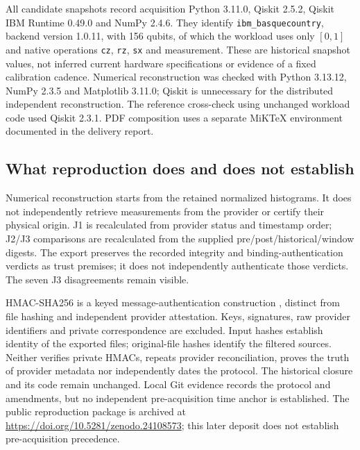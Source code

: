 \documentclass[11pt,a4paper]{article}
\begin{document}
All candidate snapshots record acquisition Python 3.11.0, Qiskit 2.5.2, Qiskit IBM Runtime 0.49.0 and NumPy 2.4.6. They identify \texttt{ibm\_basquecountry}, backend version 1.0.11, with 156 qubits, of which the workload uses only $[0,1]$ and native operations \texttt{cz}, \texttt{rz}, \texttt{sx} and measurement. These are historical snapshot values, not inferred current hardware specifications or evidence of a fixed calibration cadence. Numerical reconstruction was checked with Python 3.13.12, NumPy 2.3.5 and Matplotlib 3.11.0; Qiskit is unnecessary for the distributed independent reconstruction. The reference cross-check using unchanged workload code used Qiskit 2.3.1. PDF composition uses a separate MiKTeX environment documented in the delivery report.

\subsection{What reproduction does and does not establish}
Numerical reconstruction starts from the retained normalized histograms. It does not independently retrieve measurements from the provider or certify their physical origin. J1 is recalculated from provider status and timestamp order; J2/J3 comparisons are recalculated from the supplied pre/post/historical/window digests. The export preserves the recorded integrity and binding-authentication verdicts as trust premises; it does not independently authenticate those verdicts. The seven J3 disagreements remain visible.

HMAC-SHA256 is a keyed message-authentication construction \cite{rfc2104}, distinct from file hashing and independent provider attestation. Keys, signatures, raw provider identifiers and private correspondence are excluded. Input hashes establish identity of the exported files; original-file hashes identify the filtered sources. Neither verifies private HMACs, repeats provider reconciliation, proves the truth of provider metadata nor independently dates the protocol. The historical closure and its code remain unchanged. Local Git evidence records the protocol and amendments, but no independent pre-acquisition time anchor is established. The public reproduction package is archived at \url{https://doi.org/10.5281/zenodo.24108573}; this later deposit does not establish pre-acquisition precedence.
\end{document}
